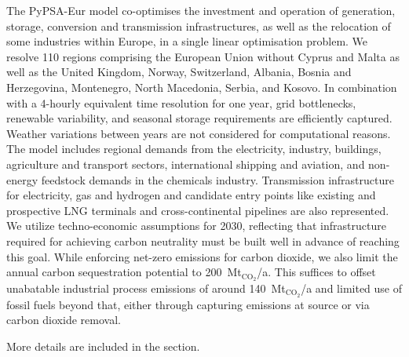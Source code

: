 The PyPSA-Eur\cite{PyPSAEurSecSectorCoupled} model co-optimises the investment
and operation of generation, storage, conversion and transmission
infrastructures, as well as the relocation of some industries within
Europe,\cite{verpoortEstimatingRenewables2023,samadiRenewablesPull2023} in a
single linear optimisation problem. We resolve 110 regions comprising the
European Union without Cyprus and Malta as well as the United Kingdom, Norway,
Switzerland, Albania, Bosnia and Herzegovina, Montenegro, North Macedonia,
Serbia, and Kosovo. In combination with a 4-hourly equivalent time resolution
for one year, grid bottlenecks, renewable variability, and seasonal storage
requirements are efficiently captured. Weather variations between years are not
considered for computational reasons. The model includes regional demands from
the electricity, industry, buildings, agriculture and transport sectors,
international shipping and aviation, and non-energy feedstock demands in the
chemicals industry. Transmission infrastructure for electricity, gas and
hydrogen and candidate entry points like existing and prospective LNG terminals
and cross-continental pipelines are also represented. We utilize techno-economic
assumptions for 2030\cite{dea2019}, reflecting that infrastructure required for
achieving carbon neutrality must be built well in advance of reaching this goal.
While enforcing net-zero emissions for carbon dioxide, we also limit the annual
carbon sequestration potential to 200~Mt$_{\text{CO}_2}$/a. This suffices to
offset unabatable industrial process emissions of around
140~Mt$_{\text{CO}_2}$/a and limited use of fossil fuels beyond that, either
through capturing emissions at source or via carbon dioxide removal.

More details are included in the  section.
